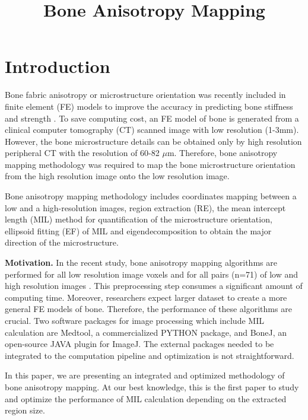 \documentclass[letterpaper]{article}
\title{Bone Anisotropy Mapping}
\newcommand{\mypar}[1]{{\bf #1.}}
\begin{document}
%
\maketitle
%

\begin{abstract}
\color{red}{Todo}
\end{abstract}

\section{Introduction}\label{sec:intro}

Bone fabric anisotropy or microstructure orientation was recently included in finite element (FE) models to improve the accuracy in predicting bone stiffness and strength \cite{Maquer:2015, Musy:2017}. To save computing cost, an FE model of bone is generated from a clinical computer tomography (CT) scanned image with low resolution (1-3mm). However, the bone microstructure details can be obtained only by high resolution peripheral CT with the resolution of 60-82 $\mu$m. Therefore, bone anisotropy mapping methodology was required to map the bone microstructure orientation from the high resolution image onto the low resolution image.

Bone anisotropy mapping methodology includes coordinates mapping between a low and a high-resolution images, region extraction (RE), the mean intercept length (MIL) method for quantification of the microstructure orientation, ellipsoid fitting (EF) of MIL and eigendecomposition to obtain the major direction of the microstructure.

\mypar{Motivation} In the recent study, bone anisotropy mapping algorithms are performed for all low resolution image voxels and for all pairs (n=71) of low and high resolution images \cite{Panyasantisuk:18}. This preprocessing step consumes a significant amount of computing time. Moreover, researchers expect larger dataset to create a more general FE models of bone. Therefore, the performance of these algorithms are crucial. Two software packages for image processing which include MIL calculation are Medtool, a commercialized PYTHON package, and BoneJ, an open-source JAVA plugin for ImageJ. The external packages needed to be integrated to the computation pipeline and optimization is not straightforward. 

In this paper, we are presenting an integrated and optimized methodology of bone anisotropy mapping. At our best knowledge, this is the first paper to study and optimize the performance of MIL calculation depending on the extracted region size.
  
\end{document}

